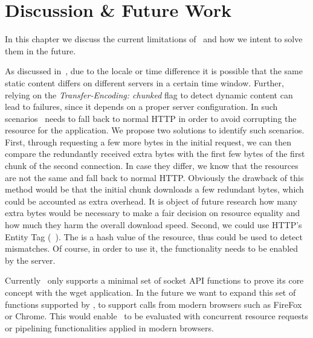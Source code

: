 \chapter{Discussion \& Future Work}
\label{ch:discussion}





In this chapter we discuss the current limitations of \protonew~and how we intent to solve them in the future. 

As discussed in~, due to the locale or time difference it is possible that the same static content differs on different servers in a certain time window. 
Further, relying on the \emph{Transfer-Encoding: chunked} flag to detect dynamic content can lead to failures, since it depends on a proper server configuration. 
In such scenarios \mhttp~needs to fall back to normal HTTP in order to avoid corrupting the resource for the application. 
We propose two solutions to identify such scenarios. 
First, through requesting a few more bytes in the initial request, we can then compare the redundantly received extra bytes with the first few bytes of the first chunk of the second connection. 
In case they differ, we know that the resources are not the same and fall back to normal HTTP. 
Obviously the drawback of this method would be that the initial chunk downloads a few redundant bytes, which could be accounted as extra overhead. 
It is object of future research how many extra bytes would be necessary to make a fair decision on resource equality and how much they harm the overall download speed. 
Second, we could use HTTP's Entity Tag (~\cite{RFC-2616}). 
The  is a hash value of the resource, thus could be used to detect mismatches. 
Of course, in order to use it, the  functionality needs to be enabled by the server. 

Currently \mhttp~only supports a minimal set of socket API functions to prove its core concept with the wget application. 
In the future we want to expand this set of functions supported by \mhttp, to support calls from modern browsers such as FireFox or Chrome. 
This would enable \mhttp~to be evaluated with concurrent resource requests or pipelining functionalities applied in modern browsers. 

